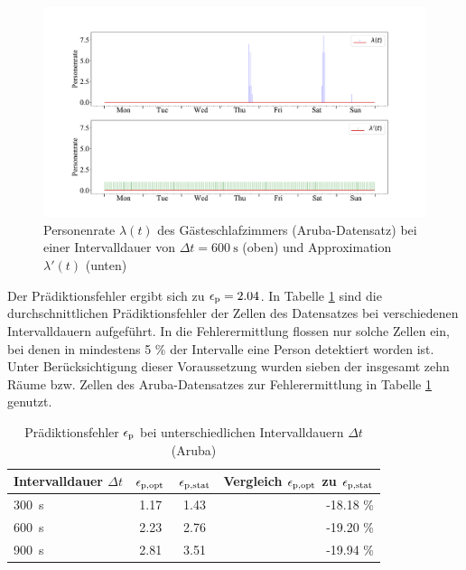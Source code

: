 \begin{figure}[!h]
	\begin{center}
		\includegraphics[width=\linewidth]{Abbildungen/evaluation/bin_size_influence_second_bedroom_float_900.pdf}
		\caption[Personenrate $\lambda (t)$ des Gästeschlafzimmers bei einer Intervalldauer von  $\Delta t = \SI{600}{\second}$ und Approximation $\lambda '(t)$]{Personenrate $\lambda (t)$ des Gästeschlafzimmers (Aruba-Datensatz) bei einer Intervalldauer von  $\Delta t = \SI{600}{\second}$ (oben) und Approximation $\lambda '(t)$ (unten)}
		\label{fig.bin_size_influence_second_bedroom_float_900.pdf}
	\end{center}
\end{figure}

Der Prädiktionsfehler  ergibt sich zu $\epsilon_{\mathrm{p}} = 2.04$. In Tabelle \ref{tab.Prädiktionsfehler aruba_float} sind die durchschnittlichen Prädiktionsfehler der Zellen des Datensatzes bei verschiedenen Intervalldauern aufgeführt. In die Fehlerermittlung flossen nur solche Zellen ein, bei denen in mindestens 5 \% der Intervalle eine Person detektiert worden ist. Unter Berücksichtigung dieser Voraussetzung wurden sieben der insgesamt zehn Räume bzw. Zellen des Aruba-Datensatzes zur Fehlerermittlung in Tabelle \ref{tab.Prädiktionsfehler aruba_float} genutzt.

\begin{table}[!h]
	\centering
	\caption{Prädiktionsfehler $\epsilon_{\mathrm{p}}$ bei unterschiedlichen Intervalldauern $\Delta t$ (Aruba)} \label{tab.Prädiktionsfehler aruba_float}
	\vspace*{-3mm}
	\begin{tabular}{lccr}
		\toprule
		Intervalldauer $\Delta t$		& $\epsilon_{\mathrm{p,opt}}$ & $\epsilon_{\mathrm{p,stat}}$  & Vergleich $\epsilon_{\mathrm{p,opt}}$ zu $\epsilon_{\mathrm{p,stat}}$              \\
		\midrule
		\SI{300}{\second}	& 1.17        & 1.43 & -18.18 \% \\
		\rowcolor{Snow2}
		\SI{600}{\second} 	& 2.23       & 2.76 & -19.20 \% \\
		\SI{900}{\second}			& 2.81        & 3.51 & -19.94 \% \\
		\bottomrule
	\end{tabular} 
\end{table}


